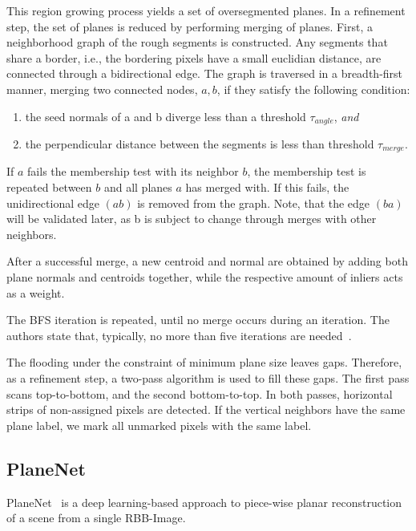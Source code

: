 \documentclass[main.tex]{subfiles}
\begin{document}
This region growing process yields a set of oversegmented planes. In a refinement step, the set of planes is reduced
by performing merging of planes.
First, a neighborhood graph of the rough segments is constructed. Any segments that share a border, i.e., the bordering
pixels have a small euclidian distance, are connected through a bidirectional edge.
The graph is traversed in a breadth-first manner, merging two connected nodes, $a,b$, if they satisfy the following condition:

\begin{enumerate}
    \item the seed normals of a and b diverge less than a threshold $\tau_{angle}$, \textit{and}
    \item the perpendicular distance between the segments is less than threshold $\tau_{merge}$.
\end{enumerate}
If $a$ fails the membership test with its neighbor $b$, the membership test is repeated between $b$ and all planes $a$
has merged with. If this fails, the unidirectional edge $(ab)$ is removed from the graph. Note, that the edge $(ba)$ will
be validated later, as b is subject to change through merges with other neighbors.

After a successful merge, a new centroid and normal are obtained by adding both plane normals and centroids together,
while the respective amount of inliers acts as a weight.

The BFS iteration is repeated, until no merge occurs during an iteration. The authors state that, typically, no more than five
iterations are needed~\cite[Section~III.E]{Roychoudhury_Missura_Bennewitz_2021_new}.

The flooding under the constraint of minimum plane size leaves gaps. Therefore, as a refinement step, a two-pass
algorithm is used to fill these gaps. The first pass scans top-to-bottom, and the second bottom-to-top.
In both passes, horizontal strips of non-assigned pixels are detected. If the vertical neighbors have the same plane label,
we mark all unmarked pixels with the same label.

\subsection{PlaneNet}
\label{subsec:bg-planenet}
PlaneNet~\cite{Liu_Yang_Ceylan_Yumer_Furukawa_2018} is a deep learning-based approach to piece-wise planar reconstruction of a scene from a single RBB-Image.
\end{document}
